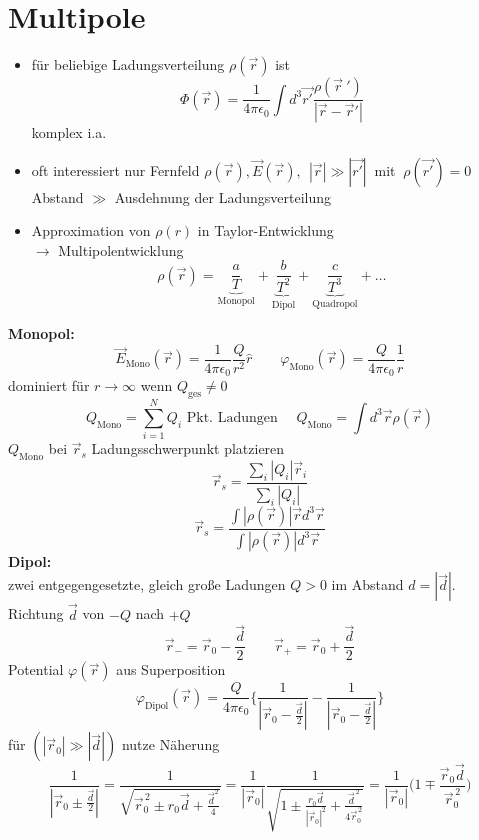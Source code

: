 \documentclass[titlepage,12pt,a4paper,ngerman]{report}
\newcommand{\tx}[1]{\textrm{#1}}
\begin{document}
\section{Multipole}
\begin{itemize}
\item für beliebige Ladungsverteilung $\rho(\vec{r})$ ist $$ \Phi (\vec{r}) = \frac{1}{4\pi\epsilon_0} \int d^3 \vec{r'} \frac{\rho(\vec{r}\: ')}{|\vec{r}-\vec{r}'|}$$ komplex i.a.
\item oft interessiert nur Fernfeld $\rho(\vec{r}), \vec{E}(\vec{r}),\ \ |\vec{r}| \gg | \vec{r'}|\ $ mit $\ \rho(\vec{r'}) = 0$\\
Abstand $\gg$ Ausdehnung der Ladungsverteilung
\item Approximation von $\rho(r)$ in Taylor-Entwicklung\\
$\rightarrow$ Multipolentwicklung
$$\rho(\vec{r}) = \underbrace{\frac{a}{T}}_{\tx{Monopol}} + \underbrace{\frac{b}{T^2}}_{\tx{Dipol}} + \underbrace{\frac{c}{T^3}}_{\tx{Quadropol}} + \dots$$ 
\end{itemize}
\textbf{Monopol:}\\
$$\vec{E}_{\tx{Mono}}(\vec{r}) = \frac{1}{4\pi\epsilon_0} \frac{Q}{r^2} \hat{r} \qquad \varphi_{\tx{Mono}}(\vec{r}) = \frac{Q}{4\pi\epsilon_0} \frac{1}{r}$$
dominiert für $r\rightarrow\infty$ wenn $Q_{\tx{ges}} \neq 0$\\
$$Q_{\tx{Mono}} = \sum_{i=1}^N Q_i \textrm{ Pkt. Ladungen } \quad Q_{\tx{Mono}} = \int d^3\vec{r} \rho (\vec{r})$$
$Q_{\tx{Mono}}$ bei $\vec{r}_s$ Ladungsschwerpunkt platzieren\\
$$\vec{r}_s = \frac{\sum_i |Q_i| \vec{r}_i}{\sum_i | Q_i|}$$
$$\vec{r}_s = \frac{\int|\rho(\vec{r})| \vec{r} d^3 \vec{r}}{\int|\rho(\vec{r})| d^3\vec{r}}$$
\textbf{Dipol:}\\
zwei entgegengesetzte, gleich große Ladungen $Q>0$ im Abstand $d = |\vec{d}|$. Richtung $\vec{d}$ von $-Q$ nach $+Q$ 
$$\vec{r}_- = \vec{r}_0 - \frac{\vec{d}}{2} \qquad \vec{r}_+ = \vec{r}_0 + \frac{\vec{d}}{2}$$
Potential $\varphi(\vec{r})$ aus Superposition
$$\varphi_{\tx{Dipol}} (\vec{r}) = \frac{Q}{4 \pi \epsilon_0} \bigg\{ \frac{1}{|\vec{r}_0 - \frac{\vec{d}}{2}|} - \frac{1}{|\vec{r}_0 - \frac{\vec{d}}{2}|} \bigg\}$$ 
für $(|\vec{r}_0| \gg |\vec{d}|)$ nutze Näherung 
$$\frac{1}{|\vec{r}_0 \pm \frac{\vec{d}}{2}|} = \frac{1}{\sqrt{\vec{r}_0^{\,2} \pm r_0 \vec{d} + \frac{\vec{d}^2}{4}}} = \frac{1}{|\vec{r}_0|} \frac{1}{\sqrt{1 \pm \frac{r_0 \vec{d}}{|\vec{r}_0|^2} + \frac{\vec{d}^{\,2}}{4 \vec{r}_0^{\,2}}}} =  \frac{1}{|\vec{r}_0|} \bigg( 1 \mp \frac{\vec{r}_0 \vec{d}}{\vec{r}_0^{\,2}}\bigg)$$
\end{document}
